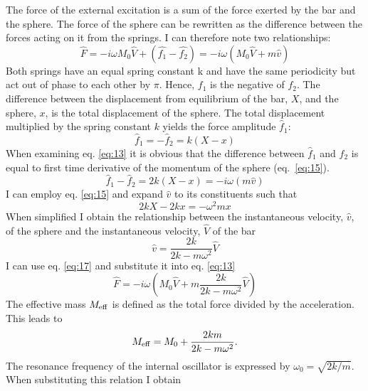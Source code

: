 \documentclass[12pt]{article}
\begin{document}
The force of the external excitation is a sum of the force exerted by the bar and the sphere. The force of  the sphere can be rewritten as the difference between the forces acting on it from the springs. I can therefore note two relationships:
\begin{equation}\label{eq:13}
	\hat{F} = -i\omega M_0 \hat{V} + \left(\hat{f_1}-\hat{f_2}\right) = -i\omega \left(M_0\hat{V} + m\hat{v} \right)
\end{equation}
Both springs have an equal spring constant k and have the same periodicity but act out of phase to each other by $\pi$. Hence, $f_1$ is the negative of $f_2$. The difference between the displacement from equilibrium of the bar, $X$, and the sphere, $x$, is the total displacement of the sphere. The total displacement multiplied by the spring constant $k$ yields the force amplitude $\hat{f}_1$:
\begin{equation}\label{eq:14}
	{\hat f_1} = -{\hat f_2} = k\left(X-x\right)
\end{equation}
When examining eq. \ref{eq:13} it is obvious that the difference between $\hat f_1$ and $\hat f_2$  is equal to first time derivative of the momentum of the sphere (eq.~\ref{eq:15}).
\begin{equation} \label{eq:15}
	\hat f_1 - \hat f_2= 2k\left(X-x\right)= -i\omega(m\hat v)
\end{equation}
I can employ eq. \ref{eq:15} and expand $\hat v$ to its constituents such that 
\begin{equation}\label{eq:16}
		2kX -2kx = -\omega^2 mx
\end{equation}
When simplified I obtain the relationship between the instantaneous velocity, $\hat v$, of the sphere and the instantaneous velocity, $\hat V$ of the bar
\begin{equation}\label{eq:17}
	\hat{v} =\frac{2k}{2k -m\omega ^2}\hat{V}
\end{equation}
I can use eq. \ref{eq:17} and substitute it into eq. \ref{eq:13}
\begin{equation}\label{eq:18}
	\hat{F} = -i\omega\left(M_0	\hat{V} + m\frac{2k}{2k -m\omega ^2}\hat{V}\right)
\end{equation}
The effective mass $M_{\rm eff}$ is defined as the total force divided by the acceleration. This leads to 
\begin{equation}\label{eq:19}
	M_{\rm eff} = M_0 + \frac{2km}{2k -m\omega ^2}.
\end{equation}
The resonance frequency of the internal oscillator is expressed by $\omega_0 = \sqrt{2k/m}$. When substituting this relation I obtain
\end{document}
